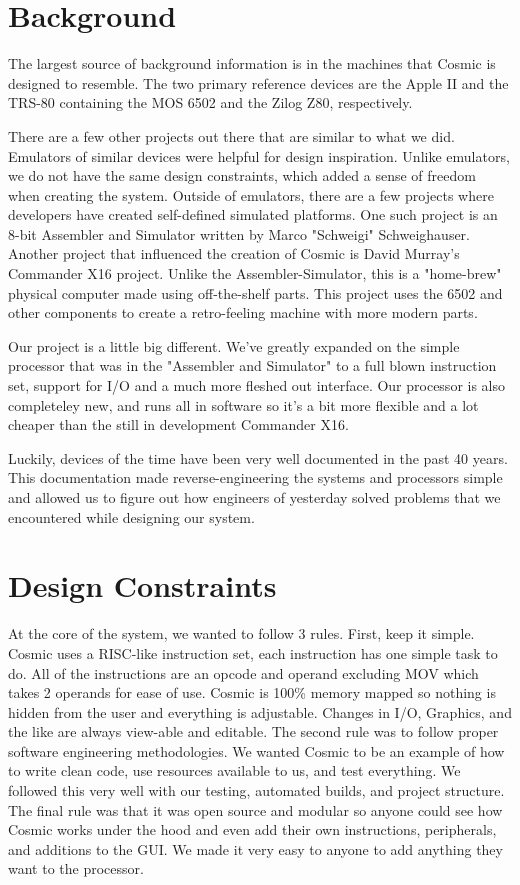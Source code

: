 \documentclass[conference]{IEEEtran}
\begin{document}
\section{Background}
The largest source of background information is in the machines that Cosmic is designed to resemble. The two primary reference devices are the Apple II and the TRS-80 containing the MOS 6502 and the Zilog Z80, respectively.

There are a few other projects out there that are similar to what we did. Emulators of similar devices were helpful for design inspiration. Unlike emulators, we do not have the same design constraints, which added a sense of freedom when creating the system. Outside of emulators, there are a few projects where developers have created self-defined simulated platforms. One such project is an 8-bit Assembler and Simulator written by Marco "Schweigi" Schweighauser\cite{b1}. Another project that influenced the creation of Cosmic is David Murray's Commander X16 project\cite{b2}. Unlike the Assembler-Simulator, this is a "home-brew" physical computer made using off-the-shelf parts. This project uses the 6502 and other components to create a retro-feeling machine with more modern parts. 

Our project is a little big different. We've greatly expanded on the simple processor that was in the "Assembler and Simulator" to a full blown instruction set, support for I/O and a much more fleshed out interface. Our processor is also completeley new, and runs all in software so it's a bit more flexible and a lot cheaper than the still in development Commander X16. 

Luckily, devices of the time have been very well documented in the past 40 years. This documentation made reverse-engineering the systems and processors simple and allowed us to figure out how engineers of yesterday solved problems that we encountered while designing our system. 


\section{Design Constraints}
At the core of the system, we wanted to follow 3 rules. First, keep it simple. Cosmic uses a RISC-like instruction set, each instruction has one simple task to do. All of the instructions are an opcode and operand excluding MOV which takes 2 operands for ease of use. Cosmic is 100\% memory mapped so nothing is hidden from the user and everything is adjustable. Changes in I/O, Graphics, and the like are always view-able and editable. The second rule was to follow proper software engineering methodologies. We wanted Cosmic to be an example of how to write clean code, use resources available to us, and test everything. We followed this very well with our testing, automated builds, and project structure. The final rule was that it was open source and modular so anyone could see how Cosmic works under the hood and even add their own instructions, peripherals, and additions to the GUI. We made it very easy to anyone to add anything they want to the processor.
\end{document}
